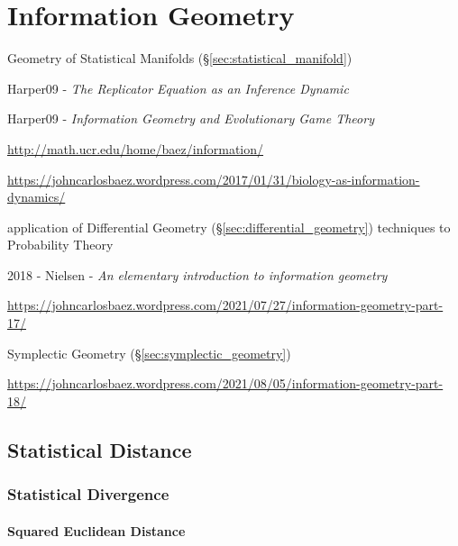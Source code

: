 \section{Information Geometry}\label{sec:information_geometry}

Geometry of Statistical Manifolds (\S\ref{sec:statistical_manifold})

Harper09 - \emph{The Replicator Equation as an Inference Dynamic}

Harper09 - \emph{Information Geometry and Evolutionary Game Theory}

\url{http://math.ucr.edu/home/baez/information/}

\url{https://johncarlosbaez.wordpress.com/2017/01/31/biology-as-information-dynamics/}

application of Differential Geometry
(\S\ref{sec:differential_geometry}) techniques to Probability Theory

2018 - Nielsen - \emph{An elementary introduction to information geometry}

\url{https://johncarlosbaez.wordpress.com/2021/07/27/information-geometry-part-17/}

Symplectic Geometry (\S\ref{sec:symplectic_geometry})

\url{https://johncarlosbaez.wordpress.com/2021/08/05/information-geometry-part-18/}



\subsection{Statistical Distance}\label{sec:statistical_distance}


\subsubsection{Statistical Divergence}\label{sec:statistical_divergence}

\paragraph{Squared Euclidean Distance}\label{sec:squared_euclidean_distance}
\hfill

